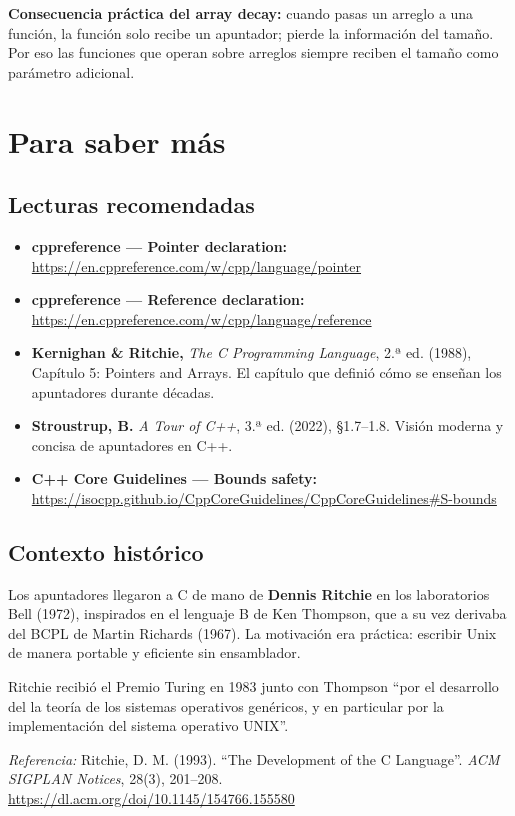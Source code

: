 \documentclass[12pt, oneside]{article}
\begin{document}
\begin{recuerda}
  \textbf{Consecuencia práctica del array decay:} cuando pasas un arreglo a
  una función, la función solo recibe un apuntador; pierde la información del
  tamaño. Por eso las funciones que operan sobre arreglos siempre reciben el
  tamaño como parámetro adicional.
\end{recuerda}

\section{Para saber más}

\subsection{Lecturas recomendadas}

\begin{itemize}
  \item \textbf{cppreference — Pointer declaration:}
        \url{https://en.cppreference.com/w/cpp/language/pointer}
  \item \textbf{cppreference — Reference declaration:}
        \url{https://en.cppreference.com/w/cpp/language/reference}
  \item \textbf{Kernighan \& Ritchie,} \textit{The C Programming Language},
        2.ª ed. (1988), Capítulo 5: Pointers and Arrays. El capítulo que
        definió cómo se enseñan los apuntadores durante décadas.
  \item \textbf{Stroustrup, B.} \textit{A Tour of C++}, 3.ª ed. (2022),
        \S1.7--1.8. Visión moderna y concisa de apuntadores en C++.
  \item \textbf{C++ Core Guidelines — Bounds safety:}
        \url{https://isocpp.github.io/CppCoreGuidelines/CppCoreGuidelines\#S-bounds}
\end{itemize}

\subsection{Contexto histórico}

\begin{tecnico}
  Los apuntadores llegaron a C de mano de \textbf{Dennis Ritchie} en los
  laboratorios Bell (1972), inspirados en el lenguaje B de Ken Thompson,
  que a su vez derivaba del BCPL de Martin Richards (1967). La motivación
  era práctica: escribir Unix de manera portable y eficiente sin ensamblador.
  \par\smallskip
  Ritchie recibió el Premio Turing en 1983 junto con Thompson ``por el
  desarrollo del la teoría de los sistemas operativos genéricos, y en
  particular por la implementación del sistema operativo UNIX''.
  \par\smallskip
  \textit{Referencia:} Ritchie, D. M. (1993). ``The Development of the C
  Language''. \textit{ACM SIGPLAN Notices}, 28(3), 201--208.
  \url{https://dl.acm.org/doi/10.1145/154766.155580}
\end{tecnico}
\end{document}
